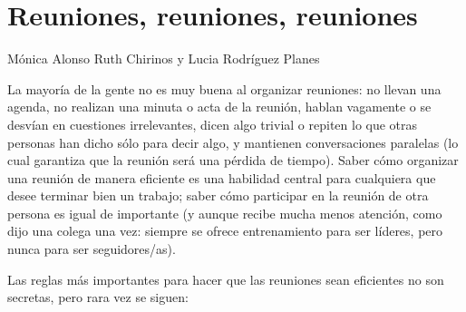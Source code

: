 \chapter{Reuniones, reuniones, reuniones}\label{s:meetings}

\begin{reviewer}
{Mónica Alonso}
{Ruth Chirinos y Lucia Rodríguez Planes}
\end{reviewer}

La mayoría de la gente no es muy buena al organizar reuniones:
no llevan una agenda,
no realizan una minuta o acta de la reunión,
hablan vagamente o se desvían en cuestiones irrelevantes,
dicen algo trivial o repiten lo que otras personas han dicho
sólo para decir algo,
y mantienen conversaciones paralelas 
(lo cual garantiza que la reunión será una pérdida de tiempo).
Saber cómo organizar una reunión de manera eficiente
es una habilidad central para cualquiera que desee terminar bien un trabajo;
saber cómo participar en la reunión de otra persona es igual de importante
(y aunque recibe mucha menos atención, como dijo una colega una vez:
siempre se ofrece entrenamiento para ser líderes,
pero nunca para ser seguidores/as).

Las reglas más importantes para hacer que las reuniones sean eficientes no son secretas,
pero rara vez se siguen:

